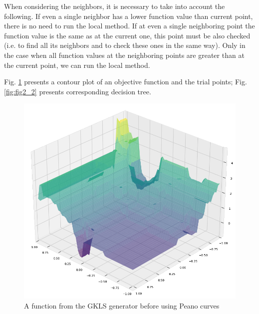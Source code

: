 \documentclass{svproc}
\begin{document}
When considering the neighbors, it is necessary to take into account the following. If even a single  neighbor has a lower function value than current point, there is no need to run the local method. If at  even a single neighboring point the function value is the same as at the current one, this point must be also checked (i.e. to find all its neighbors and to check these ones in the same way). Only in the case when  all function values at the neighboring points are greater than at the current point, we can run the local  method.

Fig. \ref{fig:fig2} presents a contour plot of an objective function and the trial points; Fig.  \ref{fig:fig2_2} presents corresponding decision tree. 


\begin{figure}[ht!]
	\begin{center}
		\begin{minipage}[h]{0.9\linewidth}
			\includegraphics[width=1\linewidth]{figure/fig4.png}
			\caption{A function from the GKLS generator before using Peano curves} %
			\label{fig:fig2}
		\end{minipage}
	\end{center}
\end{figure}	
\end{document}
